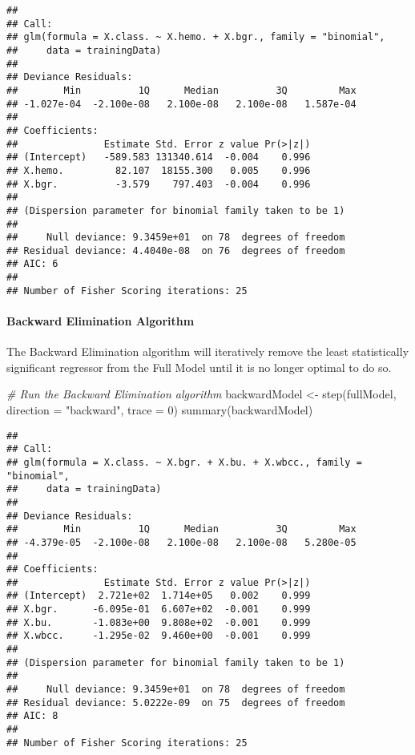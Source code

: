 \documentclass[
]{article}
\newenvironment{Shaded}{\begin{snugshade}}{\end{snugshade}}
\newcommand{\AttributeTok}[1]{\textcolor[rgb]{0.77,0.63,0.00}{#1}}
\newcommand{\CommentTok}[1]{\textcolor[rgb]{0.56,0.35,0.01}{\textit{#1}}}
\newcommand{\DecValTok}[1]{\textcolor[rgb]{0.00,0.00,0.81}{#1}}
\newcommand{\FunctionTok}[1]{\textcolor[rgb]{0.00,0.00,0.00}{#1}}
\newcommand{\NormalTok}[1]{#1}
\newcommand{\OtherTok}[1]{\textcolor[rgb]{0.56,0.35,0.01}{#1}}
\newcommand{\StringTok}[1]{\textcolor[rgb]{0.31,0.60,0.02}{#1}}
\begin{document}
\begin{verbatim}
## 
## Call:
## glm(formula = X.class. ~ X.hemo. + X.bgr., family = "binomial", 
##     data = trainingData)
## 
## Deviance Residuals: 
##        Min          1Q      Median          3Q         Max  
## -1.027e-04  -2.100e-08   2.100e-08   2.100e-08   1.587e-04  
## 
## Coefficients:
##               Estimate Std. Error z value Pr(>|z|)
## (Intercept)   -589.583 131340.614  -0.004    0.996
## X.hemo.         82.107  18155.300   0.005    0.996
## X.bgr.          -3.579    797.403  -0.004    0.996
## 
## (Dispersion parameter for binomial family taken to be 1)
## 
##     Null deviance: 9.3459e+01  on 78  degrees of freedom
## Residual deviance: 4.4040e-08  on 76  degrees of freedom
## AIC: 6
## 
## Number of Fisher Scoring iterations: 25
\end{verbatim}

\hypertarget{backward-elimination-algorithm}{%
\paragraph{Backward Elimination
Algorithm}\label{backward-elimination-algorithm}}

The Backward Elimination algorithm will iteratively remove the least
statistically significant regressor from the Full Model until it is no
longer optimal to do so.

\begin{Shaded}
\begin{Highlighting}[]
\CommentTok{\# Run the Backward Elimination algorithm}
\NormalTok{backwardModel }\OtherTok{\textless{}{-}} \FunctionTok{step}\NormalTok{(fullModel, }\AttributeTok{direction =} \StringTok{"backward"}\NormalTok{, }\AttributeTok{trace =} \DecValTok{0}\NormalTok{)}
\FunctionTok{summary}\NormalTok{(backwardModel)}
\end{Highlighting}
\end{Shaded}

\begin{verbatim}
## 
## Call:
## glm(formula = X.class. ~ X.bgr. + X.bu. + X.wbcc., family = "binomial", 
##     data = trainingData)
## 
## Deviance Residuals: 
##        Min          1Q      Median          3Q         Max  
## -4.379e-05  -2.100e-08   2.100e-08   2.100e-08   5.280e-05  
## 
## Coefficients:
##               Estimate Std. Error z value Pr(>|z|)
## (Intercept)  2.721e+02  1.714e+05   0.002    0.999
## X.bgr.      -6.095e-01  6.607e+02  -0.001    0.999
## X.bu.       -1.083e+00  9.808e+02  -0.001    0.999
## X.wbcc.     -1.295e-02  9.460e+00  -0.001    0.999
## 
## (Dispersion parameter for binomial family taken to be 1)
## 
##     Null deviance: 9.3459e+01  on 78  degrees of freedom
## Residual deviance: 5.0222e-09  on 75  degrees of freedom
## AIC: 8
## 
## Number of Fisher Scoring iterations: 25
\end{verbatim}
\end{document}
